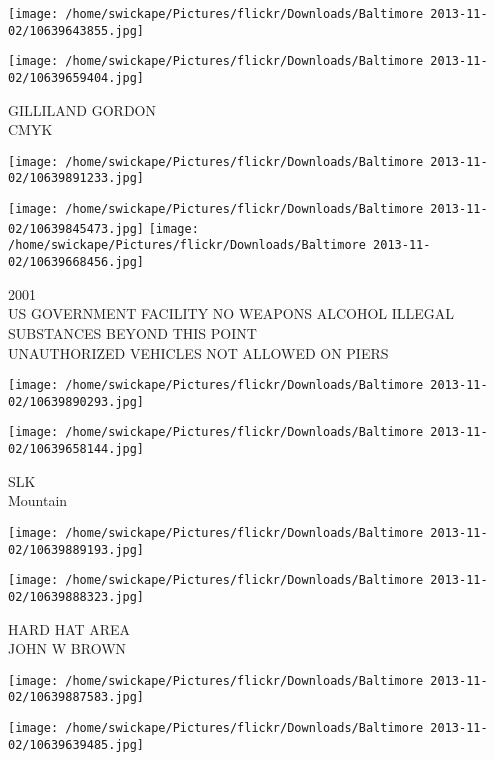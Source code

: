 \documentclass[10pt,letterpaper]{article}
\begin{document}
\texttt{[image: /home/swickape/Pictures/flickr/Downloads/Baltimore 2013-11-02/10639643855.jpg]}

\vspace{0.25in}
\texttt{[image: /home/swickape/Pictures/flickr/Downloads/Baltimore 2013-11-02/10639659404.jpg]}

GILLILAND GORDON\\
CMYK\\
\pagebreak

\texttt{[image: /home/swickape/Pictures/flickr/Downloads/Baltimore 2013-11-02/10639891233.jpg]}

\vspace{0.25in}
\texttt{[image: /home/swickape/Pictures/flickr/Downloads/Baltimore 2013-11-02/10639845473.jpg]}
\texttt{[image: /home/swickape/Pictures/flickr/Downloads/Baltimore 2013-11-02/10639668456.jpg]}

2001\\
US GOVERNMENT FACILITY NO WEAPONS ALCOHOL ILLEGAL SUBSTANCES BEYOND THIS POINT\\
UNAUTHORIZED VEHICLES NOT ALLOWED ON PIERS\\
\pagebreak

\texttt{[image: /home/swickape/Pictures/flickr/Downloads/Baltimore 2013-11-02/10639890293.jpg]}

\vspace{0.25in}
\texttt{[image: /home/swickape/Pictures/flickr/Downloads/Baltimore 2013-11-02/10639658144.jpg]}

SLK\\
Mountain\\
\pagebreak

\texttt{[image: /home/swickape/Pictures/flickr/Downloads/Baltimore 2013-11-02/10639889193.jpg]}

\vspace{0.25in}
\texttt{[image: /home/swickape/Pictures/flickr/Downloads/Baltimore 2013-11-02/10639888323.jpg]}

HARD HAT AREA\\
JOHN W BROWN\\
\pagebreak

\texttt{[image: /home/swickape/Pictures/flickr/Downloads/Baltimore 2013-11-02/10639887583.jpg]}

\vspace{0.25in}
\texttt{[image: /home/swickape/Pictures/flickr/Downloads/Baltimore 2013-11-02/10639639485.jpg]}
\end{document}
